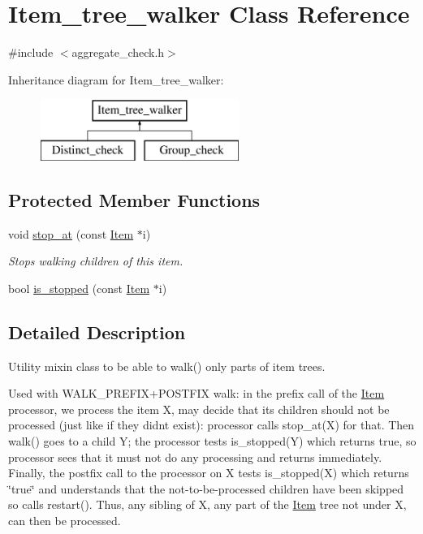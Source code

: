 \hypertarget{classItem__tree__walker}{}\section{Item\+\_\+tree\+\_\+walker Class Reference}
\label{classItem__tree__walker}


{\ttfamily \#include $<$aggregate\+\_\+check.\+h$>$}

Inheritance diagram for Item\+\_\+tree\+\_\+walker\+:\begin{figure}[H]
\begin{center}
\leavevmode
\includegraphics[height=2.000000cm]{classItem__tree__walker}
\end{center}
\end{figure}
\subsection*{Protected Member Functions}
\begin{DoxyCompactItemize}
\item 
\mbox{\label{classItem__tree__walker_a14ea76f9d8a681d69e7daa98631ee76b}} 
void \mbox{\hyperlink{classItem__tree__walker_a14ea76f9d8a681d69e7daa98631ee76b}{stop\+\_\+at}} (const \mbox{\hyperlink{classItem}{Item}} $\ast$i)
\begin{DoxyCompactList}\small\item\em Stops walking children of this item. \end{DoxyCompactList}\item 
bool \mbox{\hyperlink{classItem__tree__walker_a0788f0594f8245041d292219696c4c4e}{is\+\_\+stopped}} (const \mbox{\hyperlink{classItem}{Item}} $\ast$i)
\end{DoxyCompactItemize}


\subsection{Detailed Description}
Utility mixin class to be able to walk() only parts of item trees.

Used with W\+A\+L\+K\+\_\+\+P\+R\+E\+F\+IX+P\+O\+S\+T\+F\+IX walk\+: in the prefix call of the \mbox{\hyperlink{classItem}{Item}} processor, we process the item X, may decide that its children should not be processed (just like if they didn\textquotesingle{}t exist)\+: processor calls stop\+\_\+at(\+X) for that. Then walk() goes to a child Y; the processor tests is\+\_\+stopped(\+Y) which returns true, so processor sees that it must not do any processing and returns immediately. Finally, the postfix call to the processor on X tests is\+\_\+stopped(\+X) which returns \char`\"{}true\char`\"{} and understands that the not-\/to-\/be-\/processed children have been skipped so calls restart(). Thus, any sibling of X, any part of the \mbox{\hyperlink{classItem}{Item}} tree not under X, can then be processed. 

